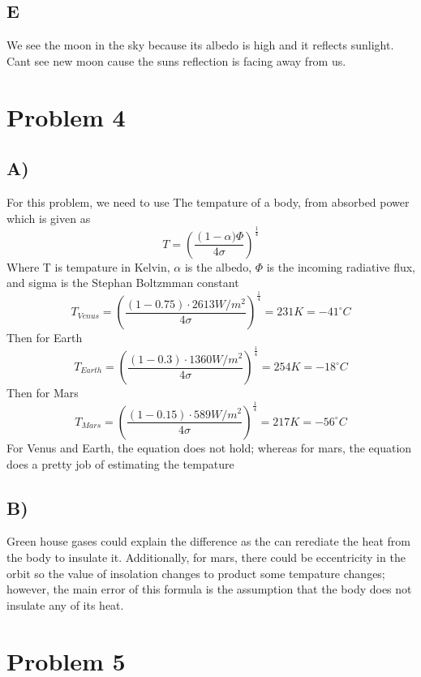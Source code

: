 \documentclass[12pt]{article}
\begin{document}
\subsection*{E}
We see the moon in the sky because its albedo is high and it reflects sunlight. Cant see new moon cause the suns reflection is facing away from us.
\section*{Problem 4}
\subsection*{A)}
For this problem, we need to use The tempature of a body, from absorbed power which is given as 
\begin{equation}
    T=\left(\frac{\left(1-\alpha) \Phi}{4\sigma}\right)^{\frac{1}{4}}
\end{equation}
Where T is tempature in Kelvin, $\alpha$ is the albedo, $\Phi$ is the incoming radiative flux, and sigma is the Stephan Boltzmman constant
\begin{equation*}
    T_{Venus}=\left(\frac{ \left(1-0.75\right) \cdot 2613W/m^2}{4\sigma}\right)^{\frac{1}{4}} = 231K  = -41^{\circ}C
\end{equation*}
Then for Earth
\begin{equation*}
    T_{Earth}=\left(\frac{ \left(1-0.3\right) \cdot 1360W/m^2}{4\sigma}\right)^{\frac{1}{4}} = 254K = -18^{\circ}C
\end{equation*}
Then for Mars
\begin{equation*}
    T_{Mars}=\left(\frac{ \left(1-0.15\right) \cdot 589W/m^2}{4\sigma}\right)^{\frac{1}{4}} = 217K=-56^{\circ}C
\end{equation*}
For Venus and Earth, the equation does not hold; whereas for mars, the equation does a pretty job of estimating the tempature
\subsection*{B)}
Green house gases could explain the difference as the can rerediate the heat from the body to insulate it. Additionally, for mars, there could be eccentricity in the orbit so the value of insolation changes to product some tempature changes; however, the main error of this formula is the assumption that the body does not insulate any of its heat.
\section*{Problem 5}
\end{document}

